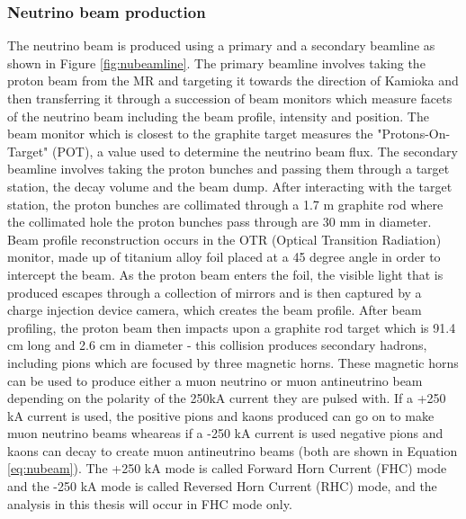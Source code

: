 \subsubsection{Neutrino beam production}

The neutrino beam is produced using a primary and a secondary beamline as shown in Figure \ref{fig:nubeamline}. The primary beamline involves taking the proton beam from the MR and targeting it towards the direction of Kamioka and then transferring it through a succession of beam monitors which measure facets of the neutrino beam including the beam profile, intensity and position. The beam monitor which is closest to the graphite target measures the "Protons-On-Target" (POT), a value used to determine the neutrino beam flux. The secondary beamline involves taking the proton bunches and passing them through a target station, the decay volume and the beam dump. After interacting with the target station, the proton bunches are collimated through a 1.7 m graphite rod where the collimated hole the proton bunches pass through are 30 mm in diameter. Beam profile reconstruction occurs in the OTR (Optical Transition Radiation) monitor, made up of titanium alloy foil placed at a 45 degree angle in order to intercept the beam. As the proton beam enters the foil, the visible light that is produced escapes through a collection of mirrors and is then captured by a charge injection device camera, which creates the beam profile. After beam profiling, the proton beam then impacts upon a graphite rod target which is 91.4 cm long and 2.6 cm in diameter - this collision produces secondary hadrons, including pions which are focused by three magnetic horns. These magnetic horns can be used to produce either a muon neutrino or muon antineutrino beam depending on the polarity of the 250kA current they are pulsed with. If a +250 kA current is used, the positive pions and kaons produced can go on to make muon neutrino beams wheareas if a -250 kA current is used negative pions and kaons can decay to create muon antineutrino beams (both are shown in Equation \ref{eq:nubeam}). The +250 kA mode is called Forward Horn Current (FHC) mode and the -250 kA mode is called Reversed Horn Current (RHC) mode, and the analysis in this thesis will occur in FHC mode only. 


